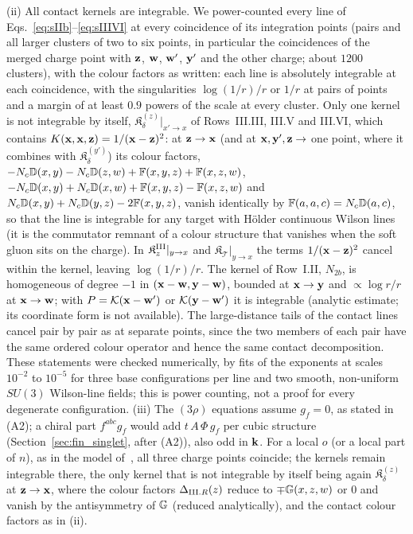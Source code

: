 (ii) All contact kernels are integrable. We power-counted every line of Eqs.~\eqref{eq:sIIb}--\eqref{eq:sIIIVI} at every coincidence of its integration points (pairs and all larger clusters of two to six points, in particular the coincidences of the merged charge point with $\mathbf{z}$, $\mathbf{w}$, $\mathbf{w}'$, $\mathbf{y}'$ and the other charge; about $1200$ clusters), with the colour factors as written: each line is absolutely integrable at each coincidence, with the singularities $\log(1/r)/r$ or $1/r$ at pairs of points and a margin of at least $0.9$ powers of the scale at every cluster. Only one kernel is not integrable by itself, $\mathfrak K^{(z)}_\delta|_{x'\to x}$ of Rows~III.III, III.V and III.VI, which contains $K(\mathbf{x},\mathbf{x},\mathbf{z})=1/(\mathbf{x}-\mathbf{z})^2$: at $\mathbf{z}\to\mathbf{x}$ (and at $\mathbf{x},\mathbf{y}',\mathbf{z}\to$ one point, where it combines with $\mathfrak K^{(y')}_\delta$) its colour factors, $-N_c\mathbb{D}(x,y)-N_c\mathbb{D}(z,w)+\mathbb{F}(x,y,z)+\mathbb{F}(x,z,w)$, $-N_c\mathbb{D}(x,y)+N_c\mathbb{D}(x,w)+\mathbb{F}(x,y,z)-\mathbb{F}(x,z,w)$ and $N_c\mathbb{D}(x,y)+N_c\mathbb{D}(y,z)-2\mathbb{F}(x,y,z)$, vanish identically by $\mathbb{F}(a,a,c)=N_c\mathbb{D}(a,c)$, so that the line is integrable for any target with H\"older continuous Wilson lines (it is the commutator remnant of a colour structure that vanishes when the soft gluon sits on the charge). In $\mathfrak K^{\rm III}_z|_{y\to x}$ and $\mathfrak K_{\mathcal T}|_{y\to x}$ the terms $1/(\mathbf{x}-\mathbf{z})^2$ cancel within the kernel, leaving $\log(1/r)/r$. The kernel of Row~I.II, $N_{2b}$, is homogeneous of degree $-1$ in $(\mathbf{x}-\mathbf{w},\mathbf{y}-\mathbf{w})$, bounded at $\mathbf{x}\to\mathbf{y}$ and $\propto\log r/r$ at $\mathbf{x}\to\mathbf{w}$; with $P=\mathcal{K}(\mathbf{x}-\mathbf{w}')$ or $\mathcal{K}(\mathbf{y}-\mathbf{w}')$ it is integrable (analytic estimate; its coordinate form is not available). The large-distance tails of the contact lines cancel pair by pair as at separate points, since the two members of each pair have the same ordered colour operator and hence the same contact decomposition. These statements were checked numerically, by fits of the exponents at scales $10^{-2}$ to $10^{-5}$ for three base configurations per line and two smooth, non-uniform $SU(3)$ Wilson-line fields; this is power counting, not a proof for every degenerate configuration.
(iii) The $(3\rho)$ equations assume $g_f=0$, as stated in (A2); a chiral part $f^{abc}g_f$ would add $t\,A\,\Phi\,g_f$ per cubic structure (Section~\ref{sec:fin_singlet}, after (A2)), also odd in $\mathbf{k}$. For a local $o$ (or a local part of $n$), as in the model of~\cite{Jeon:2005cf}, all three charge points coincide; the kernels remain integrable there, the only kernel that is not integrable by itself being again $\mathfrak K^{(z)}_\delta$ at $\mathbf{z}\to\mathbf{x}$, where the colour factors $\Delta_{{\rm III}.R}(z)$ reduce to $\mp\mathbb{G}(x,z,w)$ or $0$ and vanish by the antisymmetry of $\mathbb{G}$ (reduced analytically), and the contact colour factors as in (ii).

